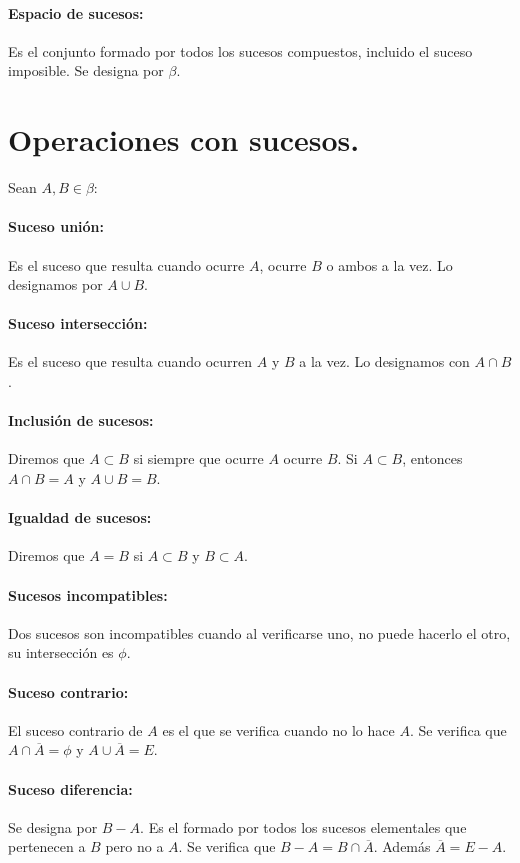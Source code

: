\paragraph{Espacio de sucesos:}
Es el conjunto formado por todos los sucesos compuestos, incluido el suceso imposible. Se designa por $\beta$.


\section{Operaciones con sucesos.}
Sean $A,B \in \beta$:
\paragraph{Suceso unión:} Es el suceso que resulta cuando ocurre $A$, ocurre $B$ o ambos a la vez. Lo designamos por $A \cup B$.
\paragraph{Suceso intersección:} Es el suceso que resulta cuando ocurren $A$ y $B$ a la vez. Lo designamos con $A \cap B$.
\paragraph{Inclusión de sucesos:} Diremos que $A \subset B$ si siempre que ocurre $A$ ocurre $B$. Si $A \subset B$, entonces $A \cap B = A$ y $A \cup B = B$.
\paragraph{Igualdad de sucesos:}Diremos que $A = B$ si $A \subset B$ y $B \subset A$.
\paragraph{Sucesos incompatibles:} Dos sucesos son incompatibles cuando al verificarse uno, no puede hacerlo el otro, su intersección es $\phi$.
\paragraph{Suceso contrario:} El suceso contrario de $A$ es el que se verifica cuando no lo hace $A$. Se verifica que $A \cap \overline{A} = \phi$ y $A \cup \overline{A} = E$.
\paragraph{Suceso diferencia:} Se designa por $B - A$. Es el formado por todos los sucesos elementales que pertenecen a $B$ pero no a $A$. Se verifica que $B - A = B \cap \overline{A}$. Además $\overline{A} = E - A$.


